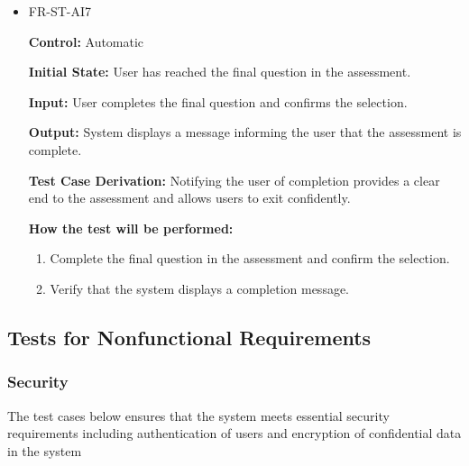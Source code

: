 \documentclass[12pt, titlepage]{article}
\begin{document}
\begin{itemize}
  \item FR-ST-AI7
    \begin{mdframed}[linewidth=0.5mm]
      \textbf{Control:} Automatic \par
      \textbf{Initial State:} User has reached the final question in the assessment. \par
      \textbf{Input:} User completes the final question and confirms the selection. \par
      \textbf{Output:} System displays a message informing the user that the assessment is complete. \par
      \textbf{Test Case Derivation:} Notifying the user of completion provides a clear end to the assessment and allows users to exit confidently. \par
      \textbf{How the test will be performed:}
      \begin{enumerate}[noitemsep]
        \item Complete the final question in the assessment and confirm the selection.
        \item Verify that the system displays a completion message.
      \end{enumerate}
    \end{mdframed}
\end{itemize}

\pagebreak

\subsection{Tests for Nonfunctional Requirements}

\subsubsection{Security}

The test cases below ensures that the system meets essential 
security requirements including authentication of users and encryption of 
confidential data in the system
		
\end{document}
